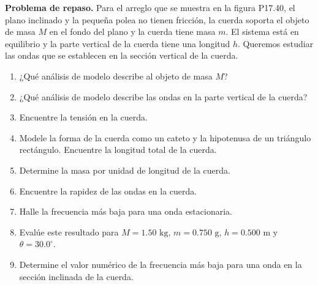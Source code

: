 \item \textbf{Problema de repaso.}
Para el arreglo que se muestra en la figura P17.40, el plano inclinado y la pequeña polea no tienen fricción, la cuerda soporta el objeto de masa $M$ en el fondo del plano y la cuerda tiene masa $m$. El sistema está en equilibrio y la parte vertical de la cuerda tiene una longitud $h$. Queremos estudiar las ondas que se establecen en la sección vertical de la cuerda.
\begin{enumerate}
    \item ¿Qué análisis de modelo describe al objeto de masa $M$?
    \item ¿Qué análisis de modelo describe las ondas en la parte vertical de la cuerda?
    \item Encuentre la tensión en la cuerda.
    \item Modele la forma de la cuerda como un cateto y la hipotenusa de un triángulo rectángulo. Encuentre la longitud total de la cuerda.
    \item Determine la masa por unidad de longitud de la cuerda.
    \item Encuentre la rapidez de las ondas en la cuerda.
    \item Halle la frecuencia más baja para una onda estacionaria.
    \item Evalúe este resultado para $M = 1.50\text{ kg}$, $m = 0.750\text{ g}$, $h = 0.500\text{ m}$ y $\theta = 30.0^\circ$.
    \item Determine el valor numérico de la frecuencia más baja para una onda en la sección inclinada de la cuerda.
\end{enumerate}